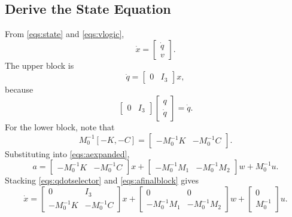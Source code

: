 \documentclass[11pt]{article}
\begin{document}
\subsection{Derive the State Equation}
From \eqref{eqs:state} and \eqref{eqs:vlogic},
\begin{equation}
    \dot{x}
    =
    \begin{bmatrix}
        \dot{q} \\
        v
    \end{bmatrix}.
    \label{eqs:xdota}
\end{equation}
The upper block is
\begin{equation}
    \dot{q}
    =
    \begin{bmatrix}
        0 & I_3
    \end{bmatrix}
    x,
    \label{eqs:qdotselector}
\end{equation}
because
\[
\begin{bmatrix}
    0 & I_3
\end{bmatrix}
\begin{bmatrix}
    q \\
    \dot{q}
\end{bmatrix}
= \dot{q}.
\]
For the lower block, note that
\begin{equation}
    M_0^{-1}[-K,-C]
    =
    \begin{bmatrix}
        -M_0^{-1}K & -M_0^{-1}C
    \end{bmatrix}.
    \label{eqs:blocksplit}
\end{equation}
Substituting into \eqref{eqs:aexpanded},
\begin{equation}
    a
    =
    \begin{bmatrix}
        -M_0^{-1}K & -M_0^{-1}C
    \end{bmatrix}
    x
    +
    \begin{bmatrix}
        -M_0^{-1}M_1 & -M_0^{-1}M_2
    \end{bmatrix}
    w
    +
    M_0^{-1}u.
    \label{eqs:afinalblock}
\end{equation}
Stacking \eqref{eqs:qdotselector} and \eqref{eqs:afinalblock} gives
\begin{equation}
    \dot{x}
    =
    \begin{bmatrix}
        0 & I_3 \\
        -M_0^{-1}K & -M_0^{-1}C
    \end{bmatrix}
    x
    +
    \begin{bmatrix}
        0 & 0 \\
        -M_0^{-1}M_1 & -M_0^{-1}M_2
    \end{bmatrix}
    w
    +
    \begin{bmatrix}
        0 \\
        M_0^{-1}
    \end{bmatrix}
    u.
    \label{eqs:stateblocks}
\end{equation}
\end{document}
